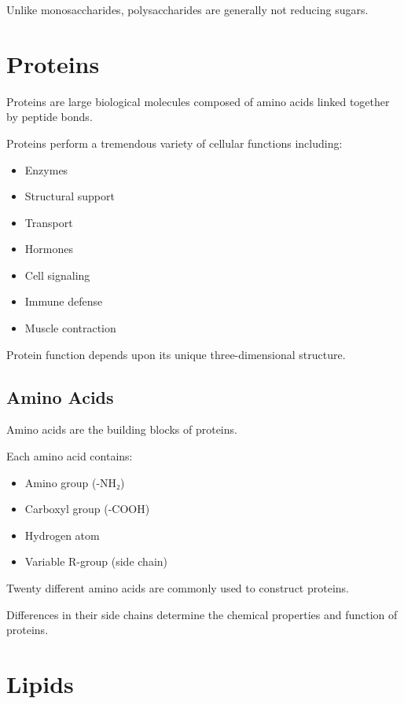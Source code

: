 \documentclass[
  letterpaper,
  DIV=11,
  numbers=noendperiod]{scrreprt}
\begin{document}
Unlike monosaccharides, polysaccharides are generally not reducing
sugars.

\section{\texorpdfstring{\textbf{Proteins}}{Proteins}}\label{proteins}

Proteins are large biological molecules composed of amino acids linked
together by peptide bonds.

Proteins perform a tremendous variety of cellular functions including:

\begin{itemize}
\item
  Enzymes
\item
  Structural support
\item
  Transport
\item
  Hormones
\item
  Cell signaling
\item
  Immune defense
\item
  Muscle contraction
\end{itemize}

Protein function depends upon its unique three-dimensional structure.

\subsection{\texorpdfstring{\textbf{Amino
Acids}}{Amino Acids}}\label{amino-acids}

Amino acids are the building blocks of proteins.

Each amino acid contains:

\begin{itemize}
\item
  Amino group (-NH₂)
\item
  Carboxyl group (-COOH)
\item
  Hydrogen atom
\item
  Variable R-group (side chain)
\end{itemize}

Twenty different amino acids are commonly used to construct proteins.

Differences in their side chains determine the chemical properties and
function of proteins.

\section{\texorpdfstring{\textbf{Lipids}}{Lipids}}\label{lipids}
\end{document}
